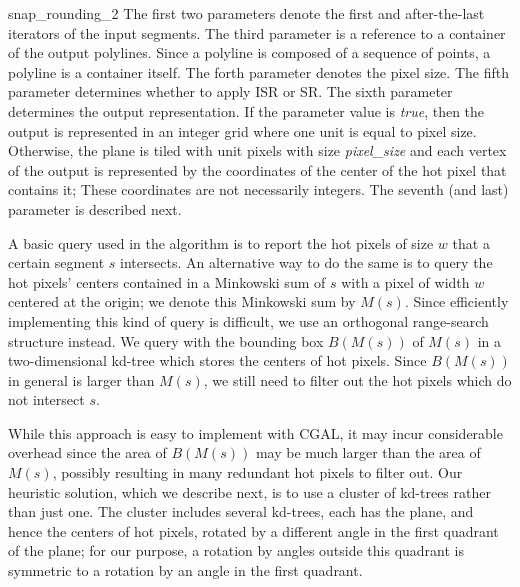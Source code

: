 \begin{ccRefFunction}{snap_rounding_2}
The first two parameters denote the first and after-the-last iterators of the input segments.
The third parameter is a reference to a container of the output polylines. Since a polyline
is composed of a sequence of points, a polyline is a container itself.
The forth parameter denotes the pixel size. The fifth parameter determines whether to apply
ISR or SR. The sixth parameter determines the output representation.
If the parameter value is {\it true}, then the output is represented in an integer
grid where one unit is equal to pixel size. Otherwise, the plane is tiled
with unit pixels with size {\it pixel\_size} and each vertex of the output is
represented by the coordinates of the center of the hot pixel that contains it;
These coordinates are not necessarily integers.
The seventh (and last) parameter is described next.

\begin{ccAdvanced}

 A basic query used in the algorithm is to report the hot pixels of
 size $w$ that a certain segment $s$ intersects.  An alternative way to
 do the same is to query the hot pixels' centers contained in a
 Minkowski sum of $s$ with a pixel of width $w$ centered at the origin;
 we denote this Minkowski sum by $M(s)$. Since efficiently implementing
 this kind of query is difficult, we use an orthogonal range-search
 structure instead. We query with the bounding box $B(M(s))$ of $M(s)$
 in a two-dimensional kd-tree which stores the centers of hot
 pixels. Since $B(M(s))$ in general is larger than $M(s)$, we still
 need to filter out the hot pixels which do not intersect $s$.

 While this approach is easy to implement with CGAL, it may incur
 considerable overhead since the area of $B(M(s))$ may be much larger
 than the area of $M(s)$, possibly resulting in many redundant hot pixels
 to filter out. Our heuristic solution, which we describe next, is to
 use a cluster of kd-trees rather than just one.  The cluster includes
 several kd-trees, each has the plane, and hence the centers of hot
 pixels, rotated by a different angle in the first quadrant of the
 plane; for our purpose, a rotation by angles outside this quadrant
 is symmetric to a rotation by an angle in the first quadrant.


\end{ccAdvanced}
\end{ccRefFunction}
